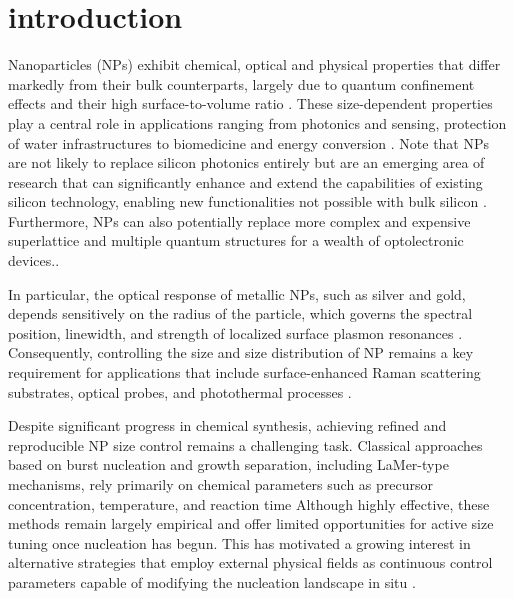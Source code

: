 \documentclass[pdflatex,sn-mathphys-num]{sn-jnl}%
\theoremstyle{thmstyleone}%
\theoremstyle{thmstyletwo}%
\theoremstyle{thmstylethree}%
\begin{document}


\maketitle
\section{introduction} Nanoparticles (NPs) exhibit chemical, optical and physical properties that differ markedly from their bulk counterparts, largely due to quantum confinement effects and their high surface-to-volume ratio \cite{10.1016/j.jallcom.2023.172999, 10.1016/j.matpr.2023.05.456, doi.org/10.1016/j.ceramint.2024.06.067, 10.1007/s11051-024-06119-8,10.1016/j.totert.2023.100038, 10.1039/D5YA00118H, D1MA00538C}. These size-dependent properties play a central role in applications ranging from photonics and sensing, protection of water infrastructures \cite{apostolakis2024photoacoustic, Cousin2022} to biomedicine and energy conversion \cite{D4MA90092H,Fabrizio12, henini2011handbook,Dong:20, 11142662, Uppu2021}.
Note that NPs are not likely to replace silicon photonics entirely but are an emerging area of research that can significantly enhance and extend the capabilities of existing silicon technology, enabling new functionalities not possible with bulk silicon \cite{Zafar2025-dl,Zafarpol4,Zafarreview,Zafarpol6,zafar2023band,zafar2023compact,ZafarIEEEAccess,Zafar:22}. 
Furthermore, NPs can also potentially replace more complex and expensive superlattice and multiple quantum structures for a wealth of optolectronic devices.\cite{Pereira2020-ii,Vaks2022-uk,ma11010002,Michler1998-cp,Grempel}.


In particular, the optical response of metallic NPs, such as silver and gold, depends sensitively on the radius of the particle, which governs the spectral position, linewidth, and strength of localized surface plasmon resonances \cite{kelly2003optical}. Consequently, controlling the size and size distribution of NP remains a key requirement for applications that include surface-enhanced Raman scattering substrates, optical probes, and photothermal processes \cite{Fabrizio12, Ganguly2024, Naccache2017}. 

Despite significant progress in chemical synthesis, achieving refined and reproducible NP size control remains a challenging task. Classical approaches based on burst nucleation and growth separation, including LaMer-type mechanisms, rely primarily on chemical parameters such as precursor concentration, temperature, and reaction time \cite{Kalikmanov2013, sugimoto2019monodispersed} Although highly effective, these methods remain largely empirical and offer limited opportunities for active size tuning once nucleation has begun. This has motivated a growing interest in alternative strategies that employ external physical fields as continuous control parameters capable of modifying the nucleation landscape in situ \cite{luo2015strong, ma2022using}.
\end{document}
